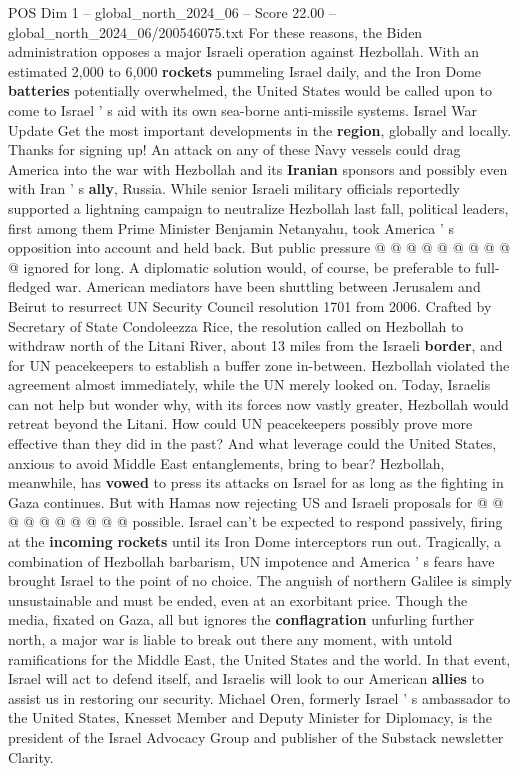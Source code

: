 \begin{textsample}{POS Dim 1 – global\_north\_2024\_06 – Score 22.00 – global\_north\_2024\_06/200546075.txt}
For these reasons, the Biden administration opposes a major Israeli operation against Hezbollah.
With an estimated 2,000 to 6,000 \textbf{rockets} pummeling Israel daily, and the Iron Dome \textbf{batteries} potentially overwhelmed, the United States would be called upon to come to Israel ' s aid with its own sea-borne anti-missile systems.
Israel War Update Get the most important developments in the \textbf{region}, globally and locally.
Thanks for signing up!
An attack on any of these Navy vessels could drag America into the war with Hezbollah and its \textbf{Iranian} sponsors and possibly even with Iran ' s \textbf{ally}, Russia.
While senior Israeli military officials reportedly supported a lightning campaign to neutralize Hezbollah last fall, political leaders, first among them Prime Minister Benjamin Netanyahu, took America ' s opposition into account and held back.
But public pressure @ @ @ @ @ @ @ @ @ @ ignored for long.
A diplomatic solution would, of course, be preferable to full-fledged war.
American mediators have been shuttling between Jerusalem and Beirut to resurrect UN Security Council resolution 1701 from 2006.
Crafted by Secretary of State Condoleezza Rice, the resolution called on Hezbollah to withdraw north of the Litani River, about 13 miles from the Israeli \textbf{border}, and for UN peacekeepers to establish a buffer zone in-between.
Hezbollah violated the agreement almost immediately, while the UN merely looked on.
Today, Israelis can not help but wonder why, with its forces now vastly greater, Hezbollah would retreat beyond the Litani.
How could UN peacekeepers possibly prove more effective than they did in the past?
And what leverage could the United States, anxious to avoid Middle East entanglements, bring to bear?
Hezbollah, meanwhile, has \textbf{vowed} to press its attacks on Israel for as long as the fighting in Gaza continues.
But with Hamas now rejecting US and Israeli proposals for @ @ @ @ @ @ @ @ @ @ possible.
Israel can't be expected to respond passively, firing at the \textbf{incoming} \textbf{rockets} until its Iron Dome interceptors run out.
Tragically, a combination of Hezbollah barbarism, UN impotence and America ' s fears have brought Israel to the point of no choice.
The anguish of northern Galilee is simply unsustainable and must be ended, even at an exorbitant price.
Though the media, fixated on Gaza, all but ignores the \textbf{conflagration} unfurling further north, a major war is liable to break out there any moment, with untold ramifications for the Middle East, the United States and the world.
In that event, Israel will act to defend itself, and Israelis will look to our American \textbf{allies} to assist us in restoring our security.
Michael Oren, formerly Israel ' s ambassador to the United States, Knesset Member and Deputy Minister for Diplomacy, is the president of the Israel Advocacy Group and publisher of the Substack newsletter Clarity.

\end{textsample}
